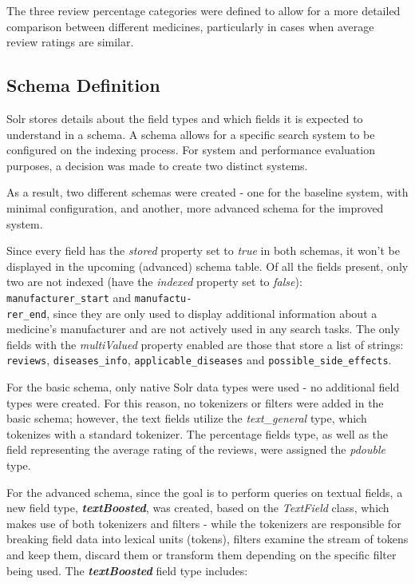 \documentclass[sigconf]{acmart}
\begin{document}
The three review percentage categories were defined to allow for a more detailed comparison between different medicines, particularly in cases when average review ratings are similar.

\subsection{Schema Definition}

Solr stores details about the field types and which fields it is expected to understand in a schema. A schema allows for a specific search system to be configured on the indexing process. For system and performance evaluation purposes, a decision was made to create two distinct systems.

As a result, two different schemas were created - one for the baseline system, with minimal configuration, and another, more advanced schema for the improved system.

Since every field has the \textit{stored} property set to \textit{true} in both schemas, it won't be displayed in the upcoming (advanced) schema table. Of all the fields present, only two are not indexed (have the \textit{indexed} property set to \textit{false}): \texttt{manufacturer\_start} and \texttt{manufactu-\\rer\_end}, since they are only used to display additional information about a medicine's manufacturer and are not actively used in any search tasks. The only fields with the \textit{multiValued} property enabled are those that store a list of strings: \texttt{reviews}, \texttt{diseases\_info}, \texttt{applicable\_diseases} and \texttt{possible\_side\_effects}.

For the basic schema, only native Solr data types were used - no additional field types were created. For this reason, no tokenizers\cite{tokenizer} or filters\cite{filters} were added in the basic schema; however, the text fields utilize the \textit{text\_general} type, which tokenizes with a standard tokenizer. The percentage fields type, as well as the field representing the average rating of the reviews, were assigned the \textit{pdouble} type.

For the advanced schema, since the goal is to perform queries on textual fields, a new field type, \textbf{\textit{textBoosted}}, was created, based on the \textit{TextField} class, which makes use of both tokenizers and filters - while the tokenizers are responsible for breaking field data into lexical units (tokens), filters examine the stream of tokens and keep them, discard them or transform them depending on the specific filter being used. The \textbf{\textit{textBoosted}} field type includes:
\end{document}
